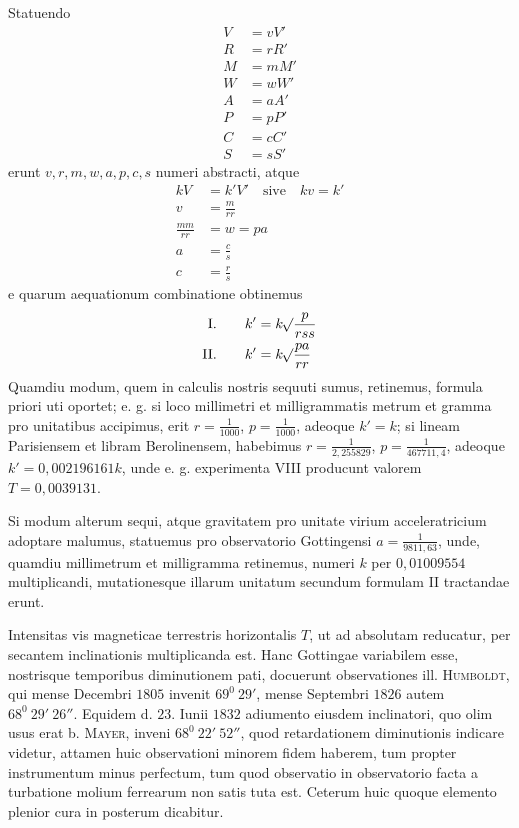 Statuendo
\[
\begin{aligned}
V&=vV'\\
R&=rR'\\
M&=mM'\\
W&=wW'\\
A&=aA'\\
P&=pP'\\
C&=cC'\\
S&=sS'
\end{aligned}
\]
erunt $v,r,m,w,a,p,c,s$ numeri abstracti, atque
\[
\begin{aligned}
kV&=k'V'\quad\text{sive}\quad kv=k'\\
v&=\frac m{rr}\\
\frac{mm}{rr}&=w=pa\\
a&=\frac cs\\
c&=\frac rs
\end{aligned}
\]
e quarum aequationum combinatione obtinemus
\[
\begin{aligned}
\text{I.}\qquad k'&=k\mathord{{}^{}\!\surd}\frac p{rss}\\
\text{II.}\qquad k'&=k\mathord{{}^{}\!\surd}\frac{pa}{rr}
\end{aligned}
\]
Quamdiu modum, quem in calculis nostris sequuti sumus, retinemus, formula priori uti oportet; e. g. si loco millimetri et milligrammatis metrum et gramma pro unitatibus accipimus, erit $r=\frac1{1000}$, $p=\frac1{1000}$, adeoque $k'=k$; si lineam Parisiensem et libram Berolinensem, habebimus $r=\frac1{2{,}255829}$, $p=\frac1{467711{,}4}$, adeoque $k'=0{,}002196161k$, unde e. g. experimenta VIII producunt valorem $T=0{,}0039131$.

Si modum alterum sequi, atque gravitatem pro unitate virium acceleratricium adoptare malumus, statuemus pro observatorio Gottingensi $a=\frac1{9811{,}63}$, unde, quamdiu millimetrum et milligramma retinemus, numeri $k$ per $0{,}01009554$ multiplicandi, mutationesque illarum unitatum secundum formulam II tractandae erunt.

Intensitas vis magneticae terrestris horizontalis $T$, ut ad absolutam reducatur, per secantem inclinationis multiplicanda est. Hanc Gottingae variabilem esse, nostrisque temporibus diminutionem pati, docuerunt observationes ill. \textsc{Humboldt}, qui mense Decembri $1805$ invenit $69^0\ 29'$, mense Septembri $1826$ autem $68^0\ 29'\ 26''$. Equidem d. $23$. Iunii $1832$ adiumento eiusdem inclinatori, quo olim usus erat b. \textsc{Mayer}, inveni $68^0\ 22'\ 52''$, quod retardationem diminutionis indicare videtur, attamen huic observationi minorem fidem haberem, tum propter instrumentum minus perfectum, tum quod observatio in observatorio facta a turbatione molium ferrearum non satis tuta est. Ceterum huic quoque elemento plenior cura in posterum dicabitur.
